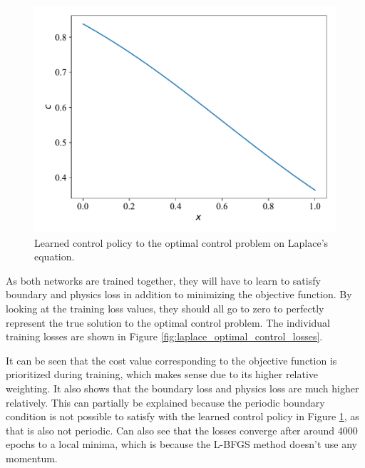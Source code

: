 \begin{figure}[H]
    \centering
    \includegraphics[width=1.0\linewidth]{Figures/IntermediateExperiments/OptimalControl/laplace_optimal_control_control.pdf}
    \caption{Learned control policy to the optimal control problem on Laplace's equation.}
    \label{fig:laplace_optimal_control_control}
\end{figure}

As both networks are trained together, they will have to learn to satisfy boundary and physics loss in addition to minimizing the objective function. By looking at the training loss values, they should all go to zero to perfectly represent the true solution to the optimal control problem. The individual training losses are shown in Figure \ref{fig:laplace_optimal_control_losses}.

It can be seen that the cost value corresponding to the objective function is prioritized during training, which makes sense due to its higher relative weighting. It also shows that the boundary loss and physics loss are much higher relatively. This can partially be explained because the periodic boundary condition is not possible to satisfy with the learned control policy in Figure \ref{fig:laplace_optimal_control_control}, as that is also not periodic. Can also see that the losses converge after around 4000 epochs to a local minima, which is because the L-BFGS method doesn't use any momentum.

